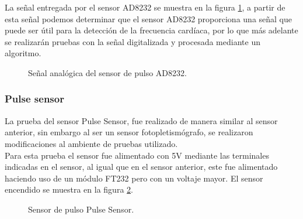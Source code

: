 La señal entregada por el sensor AD8232 se muestra en la figura \ref{fig:AD8232Osciloscopio}, a partir de esta señal podemos determinar que el sensor AD8232 proporciona una señal que puede ser útil para la detección de la frecuencia cardíaca, por lo que más adelante se realizarán pruebas con la señal digitalizada y procesada mediante un algoritmo.\\
\begin{figure}[htbp!]
	\centering
	\caption{Señal analógica del sensor de pulso AD8232.}
	\label{fig:AD8232Osciloscopio}
\end{figure}

\newpage

\subsubsection{Pulse sensor}
La prueba del sensor Pulse Sensor, fue realizado de manera similar al sensor anterior, sin embargo al ser un sensor fotopletismógrafo, se realizaron modificaciones al ambiente de pruebas utilizado.\\

Para esta prueba el sensor fue alimentado con 5V mediante las terminales indicadas en el sensor, al igual que en el sensor anterior, este fue alimentado haciendo uso de un módulo FT232 pero con un voltaje mayor. El sensor encendido se muestra en la figura \ref{fig:PulseSensor2}.

\begin{figure}[htbp!]
	\centering
	\caption{Sensor de pulso Pulse Sensor.}
	\label{fig:PulseSensor2}
\end{figure}

